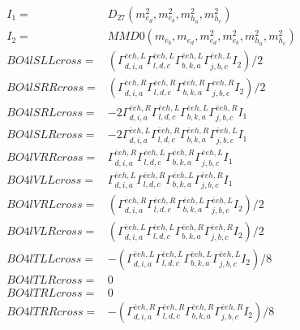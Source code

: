 \documentclass[A4,landscape]{article}
\begin{document}
\begin{align} 
I_1 = & D_{27}(m^2_{e_{{d}}}, m^2_{e_{{b}}}, m^2_{h_{{a}}}, m^2_{h_{{c}}}) \\ 
I_2 = & MMD0(m_{e_{{b}}}, m_{e_{{d}}}, m^2_{e_{{d}}}, m^2_{e_{{b}}}, m^2_{h_{{a}}}, m^2_{h_{{c}}}) \\ 
  BO4lSLLcross= & ( \Gamma^{\bar{e}e h ,L}_{d, i, a} \Gamma^{\bar{e}e h ,L}_{l, d, c} \Gamma^{\bar{e}e h ,L}_{b, k, a} \Gamma^{\bar{e}e h ,L}_{j, b, c} I_2)/2 \\ 
  BO4lSRRcross= & ( \Gamma^{\bar{e}e h ,R}_{d, i, a} \Gamma^{\bar{e}e h ,R}_{l, d, c} \Gamma^{\bar{e}e h ,R}_{b, k, a} \Gamma^{\bar{e}e h ,R}_{j, b, c} I_2)/2 \\ 
  BO4lSRLcross= & -2  \Gamma^{\bar{e}e h ,R}_{d, i, a} \Gamma^{\bar{e}e h ,L}_{l, d, c} \Gamma^{\bar{e}e h ,L}_{b, k, a} \Gamma^{\bar{e}e h ,R}_{j, b, c} I_1 \\ 
  BO4lSLRcross= & -2  \Gamma^{\bar{e}e h ,L}_{d, i, a} \Gamma^{\bar{e}e h ,R}_{l, d, c} \Gamma^{\bar{e}e h ,R}_{b, k, a} \Gamma^{\bar{e}e h ,L}_{j, b, c} I_1 \\ 
  BO4lVRRcross= &  \Gamma^{\bar{e}e h ,R}_{d, i, a} \Gamma^{\bar{e}e h ,L}_{l, d, c} \Gamma^{\bar{e}e h ,R}_{b, k, a} \Gamma^{\bar{e}e h ,L}_{j, b, c} I_1 \\ 
  BO4lVLLcross= &  \Gamma^{\bar{e}e h ,L}_{d, i, a} \Gamma^{\bar{e}e h ,R}_{l, d, c} \Gamma^{\bar{e}e h ,L}_{b, k, a} \Gamma^{\bar{e}e h ,R}_{j, b, c} I_1 \\ 
  BO4lVRLcross= & ( \Gamma^{\bar{e}e h ,R}_{d, i, a} \Gamma^{\bar{e}e h ,R}_{l, d, c} \Gamma^{\bar{e}e h ,L}_{b, k, a} \Gamma^{\bar{e}e h ,L}_{j, b, c} I_2)/2 \\ 
  BO4lVLRcross= & ( \Gamma^{\bar{e}e h ,L}_{d, i, a} \Gamma^{\bar{e}e h ,L}_{l, d, c} \Gamma^{\bar{e}e h ,R}_{b, k, a} \Gamma^{\bar{e}e h ,R}_{j, b, c} I_2)/2 \\ 
  BO4lTLLcross= & -( \Gamma^{\bar{e}e h ,L}_{d, i, a} \Gamma^{\bar{e}e h ,L}_{l, d, c} \Gamma^{\bar{e}e h ,L}_{b, k, a} \Gamma^{\bar{e}e h ,L}_{j, b, c} I_2)/8 \\ 
  BO4lTLRcross= & 0 \\ 
  BO4lTRLcross= & 0 \\ 
  BO4lTRRcross= & -( \Gamma^{\bar{e}e h ,R}_{d, i, a} \Gamma^{\bar{e}e h ,R}_{l, d, c} \Gamma^{\bar{e}e h ,R}_{b, k, a} \Gamma^{\bar{e}e h ,R}_{j, b, c} I_2)/8 \\ 
\end{align} 
\end{document}
